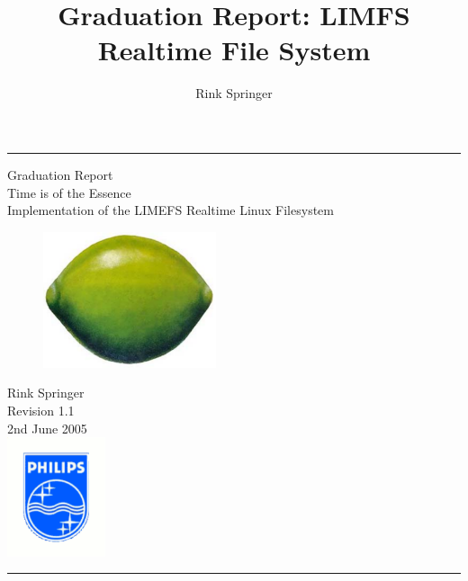 \documentclass[a4paper,11pt]{book}
\author{Rink Springer}
\title{Graduation Report: LIMFS Realtime File System}
\begin{document}
\frontmatter

\begin{titlepage}
\hrule
\vspace*{\fill}
\begin{center}
\vspace{1cm}
{\Huge Graduation Report} \\
\vspace{1cm}
{\Large Time is of the Essence} \\
Implementation of the LIMEFS Realtime Linux Filesystem\\
\vspace{1cm}
\begin{figure}[htb]
\begin{center}
\includegraphics[height=4cm]{lime-color} \\
\end{center}
\end{figure}
\vspace{1cm}
{\large Rink Springer}\\
\vspace{1.5cm}
Revision 1.1\\
2nd June 2005\\
\vspace{5mm}
\includegraphics[height=3.5cm]{philips-kleur}
\vspace{2cm}
\end{center}
\vspace*{\fill}
\hrule
\end{titlepage}





\tableofcontents
\end{document}
